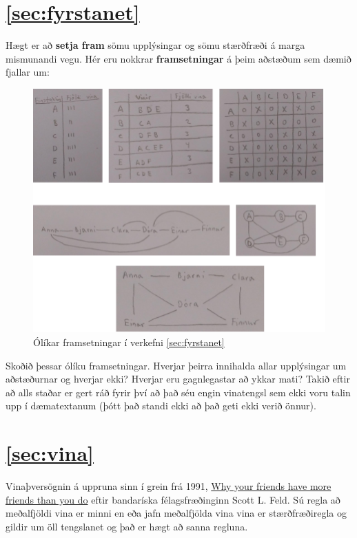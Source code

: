 \documentclass[b5paper,12pt]{book}
\begin{document}
\section*{\ref{sec:fyrstanet}}
Hægt er að \textbf{setja fram} sömu upplýsingar og sömu stærðfræði á marga mismunandi vegu. Hér eru nokkrar \textbf{framsetningar} á þeim aðstæðum sem dæmið fjallar um:
    \begin{figure}[h]
  \includegraphics[scale=0.5, center]{Fyrstunet.png}
  \caption*{Ólíkar framsetningar í verkefni \ref{sec:fyrstanet}}
\end{figure}
Skoðið þessar ólíku framsetningar. Hverjar þeirra innihalda allar upplýsingar um aðstæðurnar og hverjar ekki? Hverjar eru gagnlegastar að ykkar mati? Takið eftir að alls staðar er gert ráð fyrir því að það séu engin vinatengsl sem ekki voru talin upp í dæmatextanum (þótt það standi ekki að það geti ekki verið önnur).

\section*{\ref{sec:vina}}
Vinaþversögnin á uppruna sinn í grein frá 1991, \href{https://dx.doi.org/10.1086\%2F229693}{Why your friends have more friends than you do} eftir bandaríska félagsfræðinginn Scott L. Feld. Sú regla að meðalfjöldi vina er minni en eða jafn meðalfjölda vina vina er stærðfræðiregla og gildir um öll tengslanet og það er hægt að sanna regluna.
\end{document}
